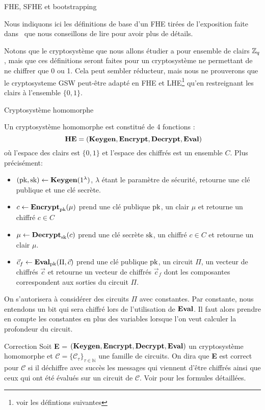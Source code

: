 \begin{section}{FHE, SFHE et bootstrapping}

Nous indiquons ici les définitions de base d'un FHE tirées de 
l'exposition faite dans~\cite{halevi} que nous conseillons 
de lire pour avoir plus de détails.

Notons que le cryptosystème que nous allons étudier a pour ensemble de clairs $\mathbb{Z}_q$, mais que ces définitions seront faites pour un cryptosystème ne permettant de ne chiffrer que 0 ou 1.
Cela peut sembler réducteur, mais nous ne prouverons que le  cryptosysteme
GSW peut-être adapté en FHE et LHE\footnote{voir les défintions suivantes} qu'en restreignant 
les clairs à l'ensemble $\{0, 1\}$.

\begin{definition}{Cryptosystème homomorphe}

Un cryptosystème homomorphe est constitué de 4 fonctions :
\[ \text{\textbf{HE}} = (\Keygen, \Enc, \Dec, \Eval)\]
où l'espace des clairs est $\{0,1\}$ et l'espace des chiffrés est un ensemble $C$.
Plus précisément:
\begin{itemize}
\item $(\text{pk}, \text{sk}) \leftarrow \text{\textbf{Keygen}}(1^\lambda)$, $\lambda$ étant le paramètre de sécurité, retourne une clé publique et une clé secrète.
\item $c \leftarrow \text{\textbf{Encrypt}}_{\text{pk}}(\mu)$ prend une clé publique $\text{pk}$, un clair $\mu$ et retourne un chiffré $c\in C$
\item $\mu \leftarrow \text{\textbf{Decrypt}}_{\text{sk}}(c)$ prend une clé secrète $\text{sk}$, un chiffré $c \in C$ et retourne un clair $\mu$.
\item $\vec{c}_f \leftarrow \text{\textbf{Eval}}_{\text{pk}}(\Pi,\vec{c})$ prend une clé publique
$\text{pk}$, un circuit  $\Pi$, un vecteur de chiffrés $\vec{c}$ et retourne un
vecteur de chiffrés $\vec{c}_f$ dont les composantes correspondent aux sorties du circuit $\Pi$.
\end{itemize}
\end{definition}
\begin{rmq}
On s'autorisera à considérer des circuits $\Pi$ avec constantes. Par constante, nous entendons
un bit qui sera chiffré lors de l'utilisation de $\text{\textbf{Eval}}$. Il faut alors prendre en compte les constantes en plus des variables lorsque l'on veut calculer la profondeur du circuit.
\end{rmq}

\begin{definition}{Correction}
Soit \textbf{E} = $(\text{\textbf{Keygen}}, \text{\textbf{Encrypt}}, \text{\textbf{Decrypt}}, \text{\textbf{Eval}})$ un cryptosystème homomorphe
et  $\mathcal{C} = \{ \mathcal{C}_\tau\}_{\tau \in \mathbb{N}}$ une famille de
circuits.  On dira que \textbf{E} est correct pour $\mathcal{C}$ si il déchiffre avec succès les messages qui viennent d'être chiffrés 
ainsi que ceux qui ont été évalués sur un circuit de $\mathcal{C}$. Voir \cite{halevi} pour les
formules détaillées.
\end{definition}


\end{section}
